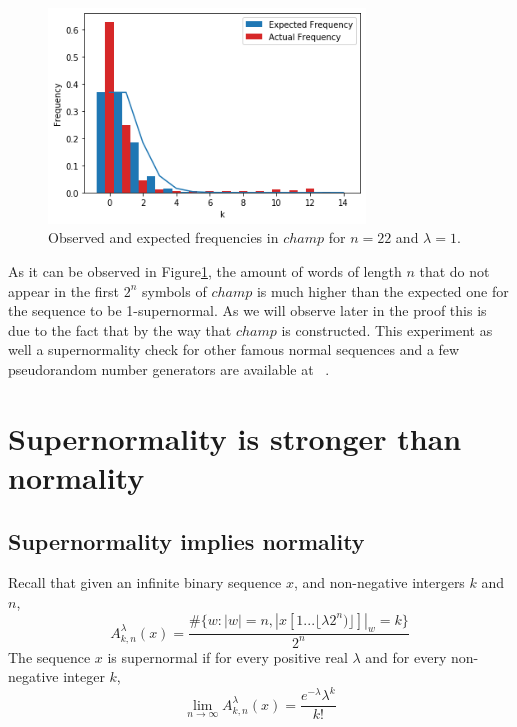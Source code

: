 \documentclass[11pt,a4paper]{tesis}
\begin{document}
\begin{figure}[h]
    \includegraphics[width=0.75\textwidth]{images/champ-22-freq-2.png}
    \centering
    \caption{Observed and expected frequencies in $champ$ for $n = 22$ and $\lambda = 1$.}
    \label{fig:champ-22-freq}
\end{figure}

As it can be observed in Figure\ref{fig:champ-22-freq}, the amount of words of length $n$ that do not appear in the first $2^n$ symbols of $champ$ is much higher than the expected one for the sequence to be 1-supernormal. As we will observe later in the proof this is due to the fact that by the way that $champ$ is constructed.
This experiment as well a supernormality check for other famous normal sequences and a few pseudorandom number generators are available at ~\cite{Puterman}.


\chapter{Supernormality is stronger than normality}
\section{Supernormality implies normality}

Recall that given an infinite  binary sequence $x$, and non-negative intergers $k$ and $n$,
$$A^\lambda_{k,n}(x) = \frac{\#\{w: |w| = n  , |x[1...\lfloor\lambda 2^n)\rfloor]|_w = k\}}{2^n}$$
The sequence $x$ is supernormal if for every positive real $\lambda$ and for every non-negative integer $k$,
$$\lim_{n\to\infty} A^\lambda_{k,n}(x) = \frac{e^{-\lambda}\lambda^k}{k!}$$ 
\end{document}
